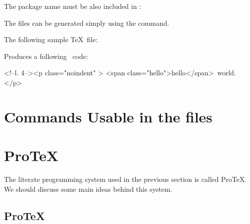 The package name must be also included in :

\begin{texsource}
\end{texsource}

The  files can be generated simply using the  command.

The following sample \TeX\ file:


Produces a following \HTML\ code:

\begin{htmlsource}
<!--l. 4--><p class="noindent" >
<span class="hello">hello</span> world. 
</p> 
\end{htmlsource}


\section{Commands Usable in the  files}





\section{ProTeX}


The literate programming system used in the previous section is called ProTeX. We should discuss some main ideas behind this system.

\subsection{ProTeX}

